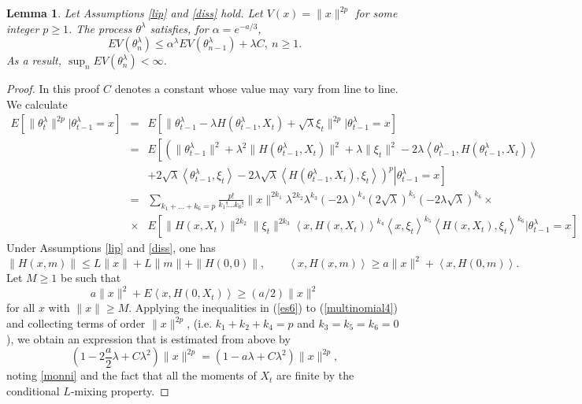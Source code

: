 \documentclass[a4paper]{article}
\newtheorem{lemma}[theorem]{Lemma}
\begin{document}
\begin{lemma}\label{dore}
Let Assumptions \ref{lip} and \ref{diss} hold. Let $V(x) = \|x\|^{2p}$ for some integer $p \ge 1$. The process $\theta^{\lambda}$ satisfies,
for $\alpha=e^{-a/3}$,
	\begin{equation}\label{ly}
	EV(\theta^{\lambda}_n) \le \alpha^{\lambda} E V(\theta^{\lambda}_{n-1}) + \lambda C,\ n\geq 1.
	\end{equation}
	As a result, $\sup_{n} E V(\theta^{\lambda}_n) < \infty$.
\end{lemma}
\begin{proof} In this proof $C$ denotes a constant whose value may vary from
line to line. We calculate
	\begin{eqnarray}
	E\left[ \|\theta^{\lambda}_t\|^{2p} | \theta^{\lambda}_{t-1}=x \right] &=& E\left[ \|\theta^{\lambda}_{t-1} - \lambda H(\theta^{\lambda}_{t-1},X_t)  + \sqrt{\lambda} \xi_t  \|^{2p} | \theta^{\lambda}_{t-1}=x \right] \nonumber\\
	&=&  E\left[ \left. \left( \|\theta^{\lambda}_{t-1}\|^2 + \lambda^2\|H(\theta^{\lambda}_{t-1},X_t)\|^2 + \lambda \|\xi_t\|^2  - 2\lambda \left\langle \theta^{\lambda}_{t-1}, H(\theta^{\lambda}_{t-1},X_t) \right\rangle  \right. \right. \right.   \nonumber \\
	&& \left. \left.  \left. + 2 \sqrt{\lambda} \left\langle \theta^{\lambda}_{t-1} , \xi_t \right\rangle - 2 \lambda \sqrt{\lambda} \left\langle H(\theta^{\lambda}_{t-1},X_t), \xi_t \right\rangle    \right)^p  \right| \theta^{\lambda}_{t-1}=x  \right] \nonumber\\
	&=& \sum_{k_1+\ldots + k_{6} = p} \frac{p!}{k_1!...k_{6}!} \| x\|^{2k_1}\lambda^{2k_2}\lambda ^{k_3} (-2\lambda)^{k_4} (2\sqrt{\lambda})^{k_5} (-2\lambda \sqrt{\lambda})^{k_6}\times  \label{multinomial4} \\
&\times& E\left[\|H(x,X_t)\|^{2k_2} \|\xi_t \|^{2k_3} \left\langle x, H(x, X_t)  \right\rangle^{k_4} \left\langle x, \xi_t \right\rangle^{k_5} \left\langle H(x,X_t), \xi_t \right\rangle  ^{k_6} | \theta^{\lambda}_{t-1}=x \right]
\nonumber	
\end{eqnarray}
Under Assumptions \ref{lip} and \ref{diss}, one has
	\begin{equation}\label{es6}
	\|H(x, m)\| \le L\|x\| + L\|m\| + \|H(0,0)\|, \qquad \left\langle x, H(x,m) \right\rangle \ge a \|x\|^2  + \left\langle x, H(0,m) \right\rangle.
	\end{equation}
	Let $M\geq 1$ be such that
\begin{equation}\label{monni}
a \|x\|^2  + E \left\langle x, H(0,X_t) \right\rangle\geq (a/2)\|x\|^2
\end{equation}
for all $x$ with $\|x\| \ge M$. Applying the inequalities in (\ref{es6}) to (\ref{multinomial4}) and collecting terms of order $\|x\|^{2p}$, (i.e. $k_1 + k_2 + k_4 = p$ and $k_3 = k_5 = k_6 = 0$), we obtain an expression that is estimated from above by
	$$(1 - 2 \frac{a}{2} \lambda + C \lambda^2)  \|x\|^{2p}=
(1 - a \lambda + C \lambda^2)  \|x\|^{2p},$$
noting \eqref{monni} and the fact that all the moments of $X_t$
are finite by the conditional $L$-mixing property.


\end{proof}
\end{document}
